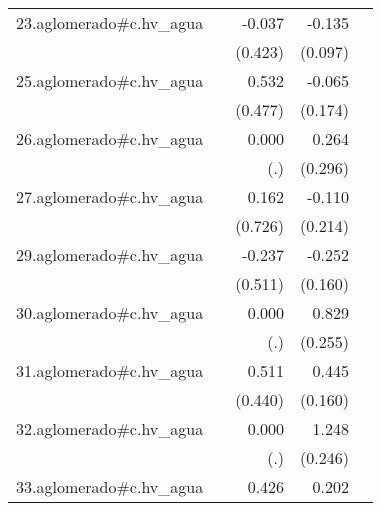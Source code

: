 {\begin{longtable}{l*{4}{D{.}{.}{-1}}}
\addlinespace
23.aglomerado#c.hv\_agua&                     &      -0.037         &      -0.135         &                     \\
            &                     &     (0.423)         &     (0.097)         &                     \\
\addlinespace
25.aglomerado#c.hv\_agua&                     &       0.532         &      -0.065         &                     \\
            &                     &     (0.477)         &     (0.174)         &                     \\
\addlinespace
26.aglomerado#c.hv\_agua&                     &       0.000         &       0.264         &                     \\
            &                     &         (.)         &     (0.296)         &                     \\
\addlinespace
27.aglomerado#c.hv\_agua&                     &       0.162         &      -0.110         &                     \\
            &                     &     (0.726)         &     (0.214)         &                     \\
\addlinespace
29.aglomerado#c.hv\_agua&                     &      -0.237         &      -0.252         &                     \\
            &                     &     (0.511)         &     (0.160)         &                     \\
\addlinespace
30.aglomerado#c.hv\_agua&                     &       0.000         &       0.829\sym{**} &                     \\
            &                     &         (.)         &     (0.255)         &                     \\
\addlinespace
31.aglomerado#c.hv\_agua&                     &       0.511         &       0.445\sym{**} &                     \\
            &                     &     (0.440)         &     (0.160)         &                     \\
\addlinespace
32.aglomerado#c.hv\_agua&                     &       0.000         &       1.248\sym{***}&                     \\
            &                     &         (.)         &     (0.246)         &                     \\
\addlinespace
33.aglomerado#c.hv\_agua&                     &       0.426         &       0.202\sym{**} &                     \\

\end{longtable}}
